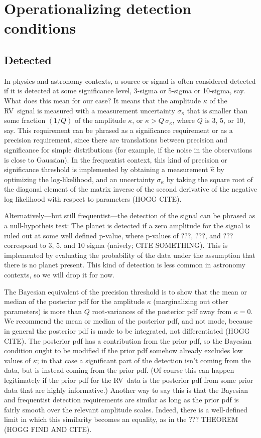 \documentclass[modern]{aastex63}
\newcommand{\acronym}[1]{{\small{#1}}}
\newcommand{\rv}{\acronym{RV}}
\begin{document}
\section{Operationalizing detection conditions}

\subsection{Detected}

In physics and astronomy contexts, a source or signal is often
considered detected if it is detected at some significance level,
3-sigma or 5-sigma or 10-sigma, say. What does this mean for our case?
It means that the amplitude $\kappa$ of the \rv\ signal is measured
with a measurement uncertainty $\sigma_\kappa$ that is smaller than
some fraction $(1/Q)$ of the amplitude $\kappa$, or $\kappa >
Q\,\sigma_\kappa$, where $Q$ is 3, 5, or 10, say.
This requirement can be phrased as a significance requirement or as a
precision requirement, since there are translations between precision
and significance for simple distributions (for example, if the noise
in the observations is close to Gaussian).
In the frequentist context, this kind of precision or significance
threshold is implemented by obtaining a measurement $\hat{\kappa}$ by
optimizing the log-likelihood, and an uncertainty $\sigma_\kappa$ by
taking the square root of the diagonal element of the matrix inverse
of the second derivative of the negative log likelihood with respect
to parameters (HOGG CITE).

Alternatively---but still frequentist---the detection of the signal
can be phrased as a null-hypotheis test: The planet is detected if a
zero amplitude for the signal is ruled out at some well defined
p-value, where p-values of ???, ???, and ??? correspond to 3, 5, and
10 sigma (naively; CITE SOMETHING).
This is implemented by evaluating the probability of the data under
the assumption that there is no planet present.
This kind of detection is less common in astronomy contexts, so we will
drop it for now.

The Bayesian equivalent of the precision threshold is to show that the
mean or median of the posterior pdf for the amplitude $\kappa$
(marginalizing out other parameters) is more than $Q$ root-variances
of the posterior pdf away from $\kappa=0$.
We recommend the mean or median of the posterior pdf, and not mode,
because in general the posterior pdf is made to be integrated, not
differentiated (HOGG CITE).
The posterior pdf has a contribution from the prior pdf, so the Bayesian
condition ought to be modified if the prior pdf somehow already excludes
low values of $\kappa$; in that case a significant part of the detection
isn't coming from the data, but is instead coming from the prior pdf.
(Of course this can happen legitimately if the prior pdf for the \rv\ data
is the posterior pdf from some prior data that are highly informative.)
Another way to say this is that the Bayesian and frequentist detection
requirements are similar as long as the prior pdf is fairly smooth over
the relevant amplitude scales.
Indeed, there is a well-defined limit in which this similarity becomes
an equality, as in the ??? THEOREM (HOGG FIND AND CITE).
\end{document}
